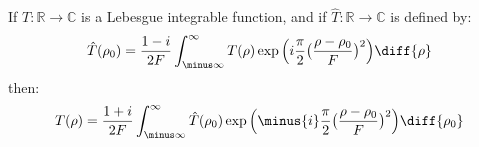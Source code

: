         \begin{theorem}
            If $T:\mathbb{R}\rightarrow\mathbb{C}$ is
            a Lebesgue integrable function, and if
            $\hat{T}:\mathbb{R}\rightarrow\mathbb{C}$
            is defined by:
            \begin{equation}
                \hat{T}(\rho_0)=
                \frac{1-i}{2F}\int_{\minus\infty}^{\infty}T(\rho)\exp\Big(
                    i\frac{\pi}{2}\big(\frac{\rho-\rho_0}{F}\big)^{2}\Big)
                \diff{\rho}
            \end{equation}
            then:
            \begin{equation}
                T(\rho)=\frac{1+i}{2F}
                    \int_{\minus\infty}^{\infty}\hat{T}(\rho_{0})\exp\Big(
                    \minus{i}\frac{\pi}{2}\big(\frac{\rho-\rho_0}{F}\big)^{2}
                    \Big)\diff{\rho_{0}}
            \end{equation}
        \end{theorem}
